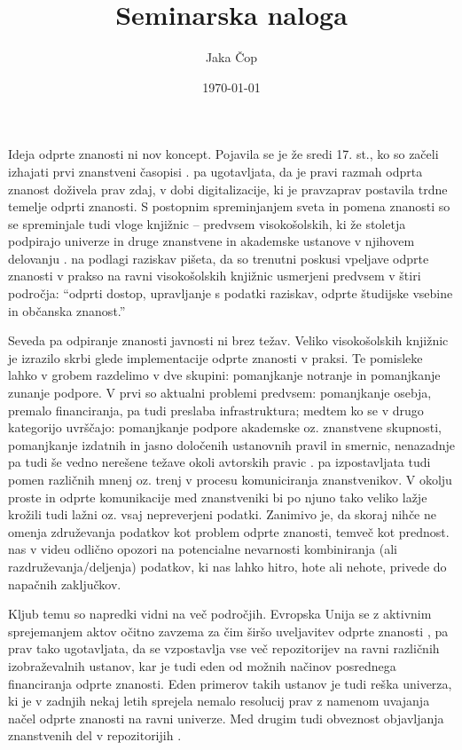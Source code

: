 \documentclass[a4paper,12pt]{article}
\title{Seminarska naloga
} %
\author{Jaka Čop}
\date{\today}
\begin{document}
\pagestyle{fancy}

\maketitle
\nocite{*}

Ideja odprte znanosti ni nov koncept. Pojavila se je že sredi 17. st., ko so začeli izhajati prvi znanstveni časopisi \parencites{Grand}{Pusnik}. \textcite{Pusnik} pa ugotavljata, da je pravi razmah odprta znanost doživela prav zdaj, v dobi digitalizacije, ki je pravzaprav postavila trdne temelje odprti znanosti. S postopnim spreminjanjem sveta in pomena znanosti so se spreminjale tudi vloge knjižnic -- predvsem visokošolskih, ki že stoletja podpirajo univerze in druge znanstvene in akademske ustanove v njihovem delovanju \parencite{Tzanova}. \textcite[str. 11]{Liu} na podlagi raziskav pišeta, da so trenutni poskusi vpeljave odprte znanosti v prakso na ravni visokošolskih knjižnic usmerjeni predvsem v štiri področja: "`odprti dostop, upravljanje s podatki raziskav, odprte študijske vsebine in občanska znanost."'

Seveda pa odpiranje znanosti javnosti ni brez težav. Veliko visokošolskih knjižnic je izrazilo skrbi glede implementacije odprte znanosti v praksi. Te pomisleke lahko v grobem razdelimo v dve skupini: pomanjkanje notranje in pomanjkanje zunanje podpore. V prvi so aktualni problemi predvsem: pomanjkanje osebja, premalo financiranja, pa tudi preslaba infrastruktura; medtem ko se v drugo kategorijo uvrščajo: pomanjkanje podpore akademske oz. znanstvene skupnosti, pomanjkanje izdatnih in jasno določenih ustanovnih pravil in smernic, nenazadnje pa tudi še vedno nerešene težave okoli avtorskih pravic \parencites{Liu}. \textcite{BawdenRobinson} pa izpostavljata tudi pomen različnih mnenj oz. trenj v procesu komuniciranja znanstvenikov. V okolju proste in odprte komunikacije med znanstveniki bi po njuno tako veliko lažje krožili tudi lažni oz. vsaj nepreverjeni podatki.  Zanimivo je, da skoraj nihče ne omenja združevanja podatkov kot problem odprte znanosti, temveč kot prednost. \textcite{Minutephysics} nas v videu odlično opozori na potencialne nevarnosti kombiniranja (ali razdruževanja/deljenja) podatkov, ki nas lahko hitro, hote ali nehote, privede do napačnih zaključkov.

Kljub temu  so napredki vidni na več področjih. Evropska Unija se z aktivnim sprejemanjem aktov očitno zavzema za čim širšo uveljavitev odprte znanosti \parencite{EuropeanCommission}, \textcite{Liu} pa prav tako ugotavljata, da se vzpostavlja vse več repozitorijev na ravni različnih izobraževalnih ustanov, kar je tudi eden od možnih načinov posrednega financiranja odprte znanosti. Eden primerov takih ustanov je tudi reška univerza, ki je v zadnjih nekaj letih sprejela nemalo resolucij prav z namenom uvajanja načel odprte znanosti na ravni univerze. Med drugim tudi obveznost objavljanja znanstvenih del v repozitorijih \parencite{DoroticMalic}.
\end{document}
